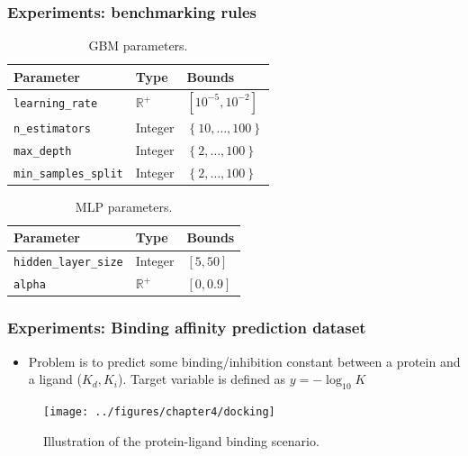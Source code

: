 \documentclass[10pt]{beamer}
\begin{document}
		\begin{frame}
		\frametitle{Experiments: benchmarking rules}
		\begin{table}[]
		\centering
		\caption{GBM parameters.}
		\label{gbmparam}
		\begin{tabular}{@{}lll@{}}
		\toprule
		\textbf{Parameter}             & \textbf{Type}  & \textbf{Bounds}                          \\ \midrule
	\texttt{learning\_rate}      & $\mathbb{R}^+$ & $\left[10^{-5}, 10^{-2}\right]$                         \\
	\texttt{n\_estimators}       & Integer        & $\left\lbrace 10,\dots, 100 \right\rbrace$ \\
	\texttt{max\_depth}          & Integer        & $\left\lbrace 2, \dots, 100 \right\rbrace$ \\
	\texttt{min\_samples\_split}  & Integer        & $\left\lbrace 2, \dots, 100 \right\rbrace$
	\end{tabular}
	\end{table}

\begin{table}[]
\centering
\caption{MLP parameters.}
\label{mlpparam}
\begin{tabular}{lll}
\hline
\textbf{Parameter}             & \textbf{Type}    & \textbf{Bounds}       \\ \hline
\texttt{hidden\_layer\_size} & Integer          & $\left[5, 50\right]$  \\
\texttt{alpha}               & $\mathbb{R}^{+}$ & $\left[0, 0.9\right]$
\end{tabular}
\end{table}

	
		\end{frame}
		
\begin{frame}
	\frametitle{Experiments: Binding affinity prediction dataset}

\begin{itemize}
\item Problem is to predict some binding/inhibition constant between a protein and a ligand ($K_d, K_i$). Target variable is defined as $y = -\log_{10}K$
\end{itemize}			

\begin{figure}
\texttt{[image: ../figures/chapter4/docking]}
\caption{Illustration of the protein-ligand binding scenario.}	
\end{figure}
\end{frame}
\end{document}
